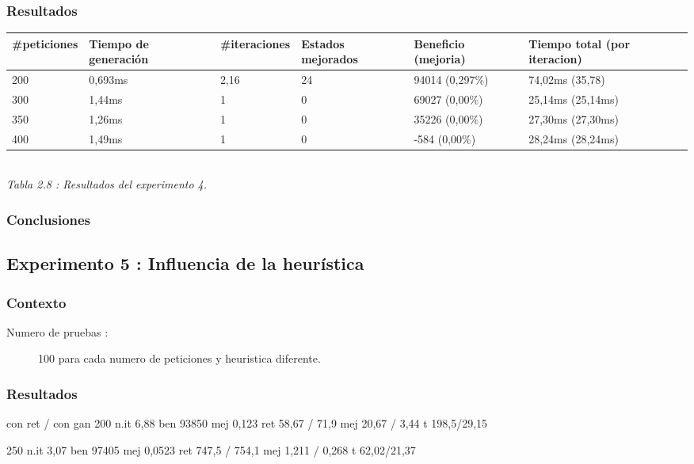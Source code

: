 \documentclass{article}
\begin{document}
\subsubsection{Resultados}

\begin{center}
\begin{tabular}{|l|l|l|l|l|l|}
\hline
\#peticiones & Tiempo de generación & \#iteraciones & Estados mejorados &
Beneficio (mejoria) & Tiempo total (por iteracion)\\
\hline
200 & 0,693ms & 2,16 & 24 & 94014 (0,297\%) & 74,02ms (35,78)\\
\hline
300 & 1,44ms & 1 & 0 & 69027 (0,00\%) & 25,14ms (25,14ms)\\
\hline
350 & 1,26ms & 1 & 0 & 35226 (0,00\%) & 27,30ms (27,30ms)\\
\hline
400 & 1,49ms & 1 & 0 & -584 (0,00\%) & 28,24ms (28,24ms)\\
\hline
\end{tabular}\\
{\it Tabla 2.8 : Resultados del experimento 4.}
\end{center}

\subsubsection{Conclusiones}

\subsection{Experimento 5 : Influencia de la heurística}

\subsubsection{Contexto}
\begin{description}
\item[Numero de pruebas :] 100 para cada numero de peticiones y heuristica
diferente.
\end{description}

\subsubsection{Resultados}
con ret / con gan
200
n.it 6,88
ben 93850
mej 0,123
ret 58,67 / 71,9
mej 20,67 / 3,44
t 198,5/29,15

250
n.it 3,07
ben 97405
mej 0,0523
ret 747,5 / 754,1
mej 1,211 / 0,268
t 62,02/21,37
\end{document}
